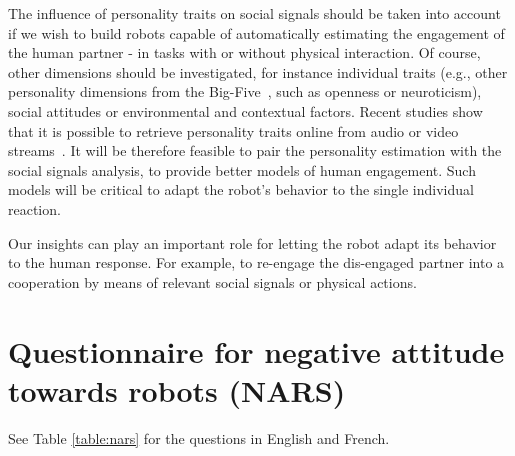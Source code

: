 The influence of personality traits on social signals should be taken into account if we wish to build robots capable of automatically estimating the engagement of the human partner - in tasks with or without physical interaction.
Of course, other dimensions should be investigated, for instance individual traits (e.g., other personality dimensions from the Big-Five~\cite{BIGFIVE}, such as openness or neuroticism), social attitudes or environmental and contextual factors. 
Recent studies show that it is possible to retrieve personality traits online from audio or video streams~\cite{mohammadi2012automatic}. 
It will be therefore feasible to pair the personality estimation with the social signals analysis, to provide better models of human engagement. Such models will be critical to adapt the robot's behavior to the single individual reaction.

Our insights can play an important role for letting the robot adapt its behavior to the human response. For example, to re-engage the dis-engaged partner into a cooperation by means of relevant social signals or physical actions.


\section{Questionnaire for negative attitude towards robots (NARS)}\label{appendix:nars}

See Table \ref{table:nars} for the questions in English and French.

